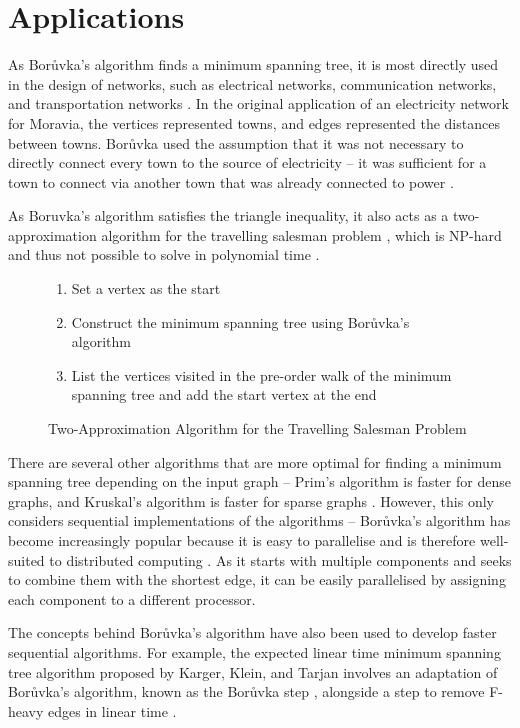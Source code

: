 \documentclass[a4paper, 11pt]{article}
\begin{document}
\section{Applications}
As Borůvka's algorithm finds a minimum spanning tree, it is most directly used in the design of networks, such as electrical networks, communication networks, and transportation networks \cite{graham1985history}. In the original application of an electricity network for Moravia, the vertices represented towns, and edges represented the distances between towns. Borůvka used the assumption that it was not necessary to directly connect every town to the source of electricity -- it was sufficient for a town to connect via another town that was already connected to power \cite{nevsetvril2001otakar}.

As Boruvka's algorithm satisfies the triangle inequality, it also acts as a two-approximation algorithm for the travelling salesman problem \cite{andreae1995performance}, which is NP-hard and thus not possible to solve in polynomial time \cite{junger1995traveling}.

\begin{figure}[h]
    \caption{Two-Approximation Algorithm for the Travelling Salesman Problem}
    \begin{enumerate}
        \setlength\itemsep{0em}
        \item Set a vertex as the start
        \item Construct the minimum spanning tree using Borůvka's algorithm
        \item List the vertices visited in the pre-order walk of the minimum spanning tree and add the start vertex at the end
    \end{enumerate}
\end{figure}


There are several other algorithms that are more optimal for finding a minimum spanning tree depending on the input graph -- Prim's algorithm is faster for dense graphs, and Kruskal's algorithm is faster for sparse graphs \cite{bazlamaccci2001minimum}. However, this only considers sequential implementations of the algorithms -- Borůvka's algorithm has become increasingly popular because it is easy to parallelise and is therefore well-suited to distributed computing \cite{mariano2015generic}. As it starts with multiple components and seeks to combine them with the shortest edge, it can be easily parallelised by assigning each component to a different processor.

The concepts behind Borůvka's algorithm have also been used to develop faster sequential algorithms. For example, the expected linear time minimum spanning tree algorithm proposed by Karger, Klein, and Tarjan involves an adaptation of Borůvka's algorithm, known as the Borůvka step \cite{dixon1992verification, king1995simpler}, alongside a step to remove F-heavy edges in linear time \cite{karger1995randomized}.

\newpage


\end{document}
